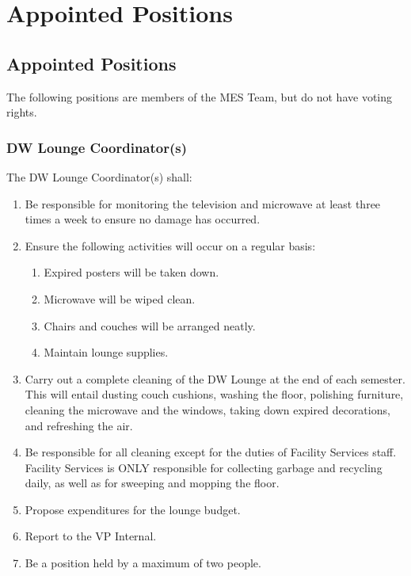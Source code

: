 \section{Appointed Positions}
\label{appointed-positions}
\subsection{Appointed Positions}
\label{appointed-positions1}

The following positions are members of the MES Team, but do not have voting rights.

\subsubsection{DW Lounge Coordinator(s)}
\label{dw-lounge-coordinators}
The DW Lounge Coordinator(s) shall:

\begin{enumerate}
 \item
  Be responsible for monitoring the television and microwave at least three times a week to ensure no damage has occurred.
 \item
  Ensure the following activities will occur on a regular basis:

  \begin{enumerate}
   \item
    Expired posters will be taken down.
   \item
    Microwave will be wiped clean.
   \item
    Chairs and couches will be arranged neatly.
   \item
    Maintain lounge supplies.
  \end{enumerate}
 \item
  Carry out a complete cleaning of the DW Lounge at the end of each semester. This will entail dusting couch cushions, washing the floor, polishing furniture, cleaning the microwave and the windows, taking down expired decorations, and refreshing the air.
 \item
  Be responsible for all cleaning except for the duties of Facility Services staff. Facility Services is ONLY responsible for collecting garbage and recycling daily, as well as for sweeping and mopping the floor.
 \item
  Propose expenditures for the lounge budget.
 \item
  Report to the VP Internal.
 \item
  Be a position held by a maximum of two people.
\end{enumerate}

